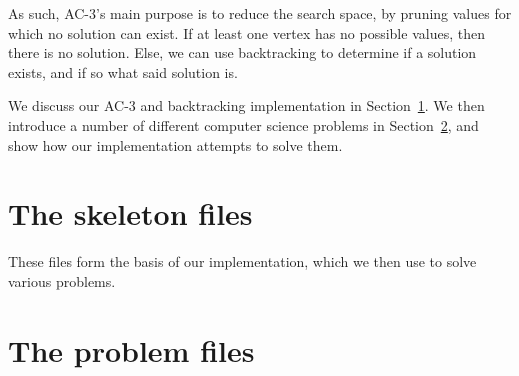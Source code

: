 \documentclass[12pt,a4paper]{article}
\begin{document}
As such, AC-3's main purpose is to reduce the search space, by pruning values for which no
 solution can exist. If at least one vertex has no possible values, then there is no solution.
Else, we can use backtracking to determine if a solution exists, and if so what said solution is.

We discuss our AC-3 and backtracking implementation in Section~\ref{sec:skeleton}. 
We then introduce a number of different computer science problems in Section~\ref{sec:problems}, and show how our implementation
attempts to solve them. 

\section{The skeleton files}\label{sec:skeleton}
These files form the basis of our implementation, which we then use to solve various problems.





\section{The problem files}\label{sec:problems} %













% 





\end{document}
